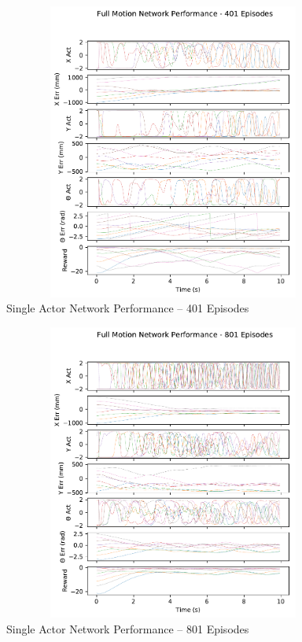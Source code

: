 \begin{figure}[H]
	\centering
	\includegraphics[width=6in, height=3.85in, keepaspectratio]{figures/train_figs/all_transitions/3_401.pdf}
	\caption{Single Actor Network Performance -- 401 Episodes}
\end{figure}
\begin{figure}[H]
	\centering
	\includegraphics[width=6in, height=3.85in, keepaspectratio]{figures/train_figs/all_transitions/3_801.pdf}
	\caption{Single Actor Network Performance -- 801 Episodes}
\end{figure}
